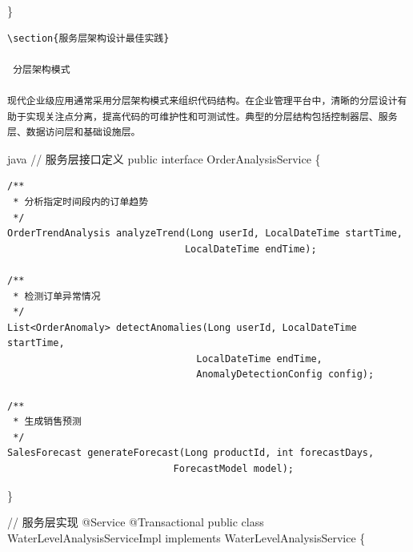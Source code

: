 \}

\begin{lstlisting}
\section{服务层架构设计最佳实践}

 分层架构模式

现代企业级应用通常采用分层架构模式来组织代码结构。在企业管理平台中，清晰的分层设计有助于实现关注点分离，提高代码的可维护性和可测试性。典型的分层结构包括控制器层、服务层、数据访问层和基础设施层。
\end{lstlisting}

java // 服务层接口定义 public interface OrderAnalysisService \{

\begin{verbatim}
/**
 * 分析指定时间段内的订单趋势
 */
OrderTrendAnalysis analyzeTrend(Long userId, LocalDateTime startTime, 
                               LocalDateTime endTime);

/**
 * 检测订单异常情况
 */
List<OrderAnomaly> detectAnomalies(Long userId, LocalDateTime startTime, 
                                 LocalDateTime endTime, 
                                 AnomalyDetectionConfig config);

/**
 * 生成销售预测
 */
SalesForecast generateForecast(Long productId, int forecastDays,
                             ForecastModel model);
\end{verbatim}

\}

// 服务层实现 @Service @Transactional public class WaterLevelAnalysisServiceImpl implements WaterLevelAnalysisService \{

